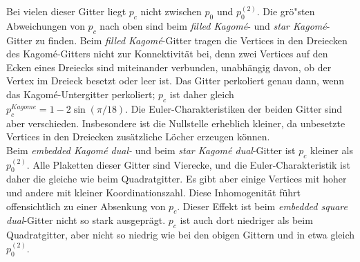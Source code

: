 Bei vielen dieser Gitter liegt $p_c$ nicht zwischen $p_0$ und $p_0^{(2)}$. Die gr\"o"sten Abweichungen von $p_c$ nach oben sind beim \textit{filled Kagom\'e}- und \textit{star Kagom\'e}-Gitter zu finden. Beim \textit{filled Kagom\'e}-Gitter tragen die Vertices in den Dreiecken des Kagom\'e-Gitters nicht zur Konnektivit\"at bei, denn zwei Vertices auf den Ecken eines Dreiecks sind miteinander verbunden, unabh\"angig davon, ob der Vertex im Dreieck besetzt oder leer ist. Das Gitter perkoliert genau dann, wenn das Kagom\'e-Untergitter perkoliert; $p_c$ ist daher gleich $p_c^{Kagome}=1-2\sin(\pi/18)$. Die Euler-Charakteristiken der beiden Gitter sind aber verschieden. Insbesondere ist die Nullstelle erheblich kleiner, da unbesetzte Vertices in den Dreiecken zus\"atzliche L\"ocher erzeugen k\"onnen.\\
Beim \textit{embedded Kagom\'e dual-} und beim \textit{star Kagom\'e dual}-Gitter ist $p_c$ kleiner als $p_0^{(2)}$. Alle Plaketten dieser Gitter sind Vierecke, und die Euler-Charakteristik ist daher die gleiche wie beim Quadratgitter. Es gibt aber einige Vertices mit hoher und andere mit kleiner Koordinationszahl. Diese Inhomogenit\"at f\"uhrt offensichtlich zu einer Absenkung von $p_c$. Dieser Effekt ist beim \textit{embedded square dual}-Gitter nicht so stark ausgepr\"agt. $p_c$ ist auch dort niedriger als beim Quadratgitter, aber nicht so niedrig wie bei den obigen Gittern und in etwa gleich $p_0^{(2)}$. 

